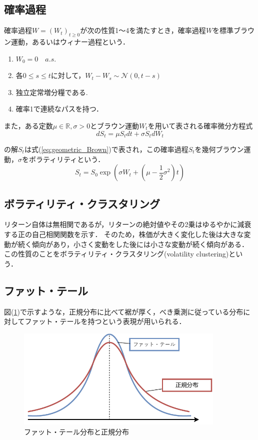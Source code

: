 \documentclass[titlepage]{jsreport}
\begin{document}
\subsection{確率過程}
確率過程$W = (W_t)_{t \geq 0}$が次の性質1～4を満たすとき，確率過程$W$を標準ブラウン運動，あるいはウィナー過程という\cite{stochastic_integration}．
\begin{enumerate}
    \item $W_0 = 0 \quad a.s.$
    \item 各$0 \leq s \leq t$に対して，$W_t - W_s \sim \mathcal{N}(0, t - s)$
    \item 独立定常増分糧である.
    \item 確率1で連続なパスを持つ．
\end{enumerate}

また，ある定数$\mu \in \mathbb{R}, \sigma > 0$とブラウン運動$W_t$を用いて表される確率微分方程式
\begin{equation}
    dS_t = \mu S_t dt + \sigma S_t dW_t \label{eq:geoBrow_equation}
\end{equation}

の解$S_t$は式(\ref{eq:geometric_Brown})で表され，この確率過程$S_t$を幾何ブラウン運動，$\sigma$をボラティリティという\cite{Stochastic_Calculus}．
\begin{equation}
    S_t = S_0 \exp{\left(\sigma W_t + \left( \mu - \frac{1}{2}\sigma^2 \right)t\right)} \label{eq:geometric_Brown}
\end{equation}

\subsection{ボラティリティ・クラスタリング}
リターン自体は無相関であるが，リターンの絶対値やその2乗はゆるやかに減衰する正の自己相関関数を示す\cite{Cont2007}．
そのため，株価が大きく変化した後は大きな変動が続く傾向があり，小さく変動をした後には小さな変動が続く傾向がある\cite{return_correlation}．
この性質のことをボラティリティ・クラスタリング(volatility clustering)という．

\subsection{ファット・テール}
図(\ref{fig:fat_tail})で示すような，正規分布に比べて裾が厚く，べき乗測に従っている分布に対してファット・テールを持つという表現が用いられる\cite{fat-tailed}．
\begin{figure}[htbp]
    \centering
    \includegraphics[width=10cm]{fig/fat_tail.drawio.pdf}
    \caption{ファット・テール分布と正規分布}
    \label{fig:fat_tail}
\end{figure}
\end{document}
